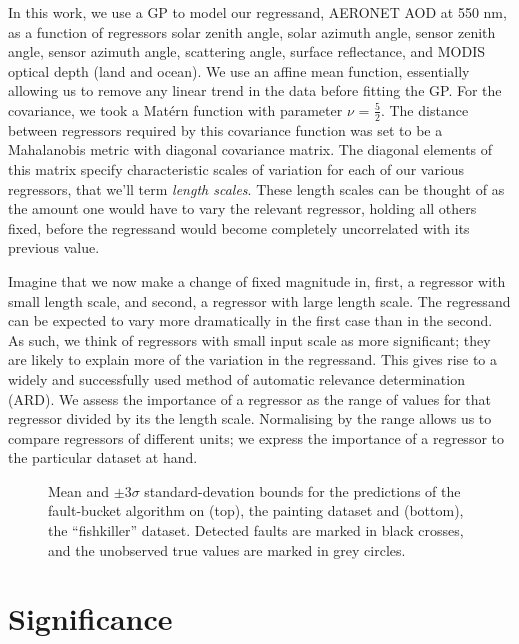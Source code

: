 \documentclass[journal]{IEEEtran}
\begin{document}
In this work, we use a GP to model our regressand, AERONET AOD at 550 nm, as a function of regressors solar zenith angle, solar azimuth angle,  sensor zenith angle, sensor azimuth angle,  scattering angle, surface reflectance, and MODIS optical depth (land and ocean). We use an affine mean function, essentially allowing us to remove any linear trend in the data before fitting the GP. For the covariance, we took a Mat\'{e}rn function with parameter $\nu$ = $\frac{5}{2}$. The distance between regressors required by this covariance function was set to be a Mahalanobis metric with diagonal covariance matrix. The diagonal elements of this matrix specify characteristic scales of variation for each of our various regressors, that we'll term \emph{length scales}. These length scales can be thought of as the amount one would have to vary the relevant regressor, holding all others fixed, before the regressand would become completely uncorrelated with its previous value.  

Imagine that we now make a change of fixed magnitude in, first, a regressor with small length scale, and second, a regressor with large length scale. The regressand can be expected to vary more dramatically in the first case than in the second. As such, we think of regressors with small input scale as more significant; they are likely to explain more of the variation in the regressand. This gives rise to a widely and successfully used \cite{GPsBook} method of automatic relevance determination (ARD). We assess the importance of a regressor as the range of values for that regressor divided by its the length scale. Normalising by the range allows us to compare regressors of different units; we express the importance of a regressor to the particular dataset at hand. 

\begin{figure*}
  \centering
  \small
{}
\hspace{-1cm}
  \caption{Mean and $\pm3\sigma$ standard-devation bounds for the
    predictions of the fault-bucket algorithm on (top), the painting
    dataset and (bottom), the ``fishkiller'' dataset.  Detected faults are
    marked in black crosses, and the unobserved true values are marked
    in grey circles.}
  \label{justfb}
\end{figure*}

\section{Significance}
\end{document}
